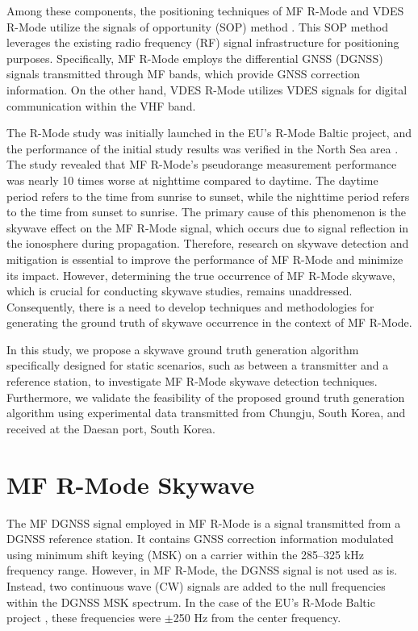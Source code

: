 \documentclass[conference]{IEEEtran}
\begin{document}
Among these components, the positioning techniques of MF R-Mode and VDES R-Mode utilize the signals of opportunity (SOP) method \cite{Mcellroy2006:navigation, Wang21:Signal, Huang22:Phase, Yang22:UAV}. 
This SOP method leverages the existing radio frequency (RF) signal infrastructure for positioning purposes. 
Specifically, MF R-Mode employs the differential GNSS (DGNSS) signals transmitted through MF bands, which provide GNSS correction information. 
On the other hand, VDES R-Mode utilizes VDES signals for digital communication within the VHF band.

The R-Mode study was initially launched in the EU's R-Mode Baltic project, and the performance of the initial study results was verified in the North Sea area \cite{Johnson2014:feasibility3}. 
The study revealed that MF R-Mode's pseudorange measurement performance was nearly 10 times worse at nighttime compared to daytime. 
The daytime period refers to the time from sunrise to sunset, while the nighttime period refers to the time from sunset to sunrise. 
The primary cause of this phenomenon is the skywave effect on the MF R-Mode signal, which occurs due to signal reflection in the ionosphere during propagation. 
Therefore, research on skywave detection and mitigation is essential to improve the performance of MF R-Mode and minimize its impact. 
However, determining the true occurrence of MF R-Mode skywave, which is crucial for conducting skywave studies, remains unaddressed. Consequently, there is a need to develop techniques and methodologies for generating the ground truth of skywave occurrence in the context of MF R-Mode.

In this study, we propose a skywave ground truth generation algorithm specifically designed for static scenarios, such as between a transmitter and a reference station, to investigate MF R-Mode skywave detection techniques. 
Furthermore, we validate the feasibility of the proposed ground truth generation algorithm using experimental data transmitted from Chungju, South Korea, and received at the Daesan port, South Korea.


\section{MF R-Mode Skywave}
\label{sec:Skywave}

The MF DGNSS signal employed in MF R-Mode is a signal transmitted from a DGNSS reference station. 
It contains GNSS correction information modulated using minimum shift keying (MSK) on a carrier within the 285--325 kHz frequency range. 
However, in MF R-Mode, the DGNSS signal is not used as is. 
Instead, two continuous wave (CW) signals are added to the null frequencies within the DGNSS MSK spectrum.
In the case of the EU's R-Mode Baltic project \cite{Johnson2014:feasibility3}, these frequencies were $\pm$250 Hz  from the center frequency.
\end{document}
